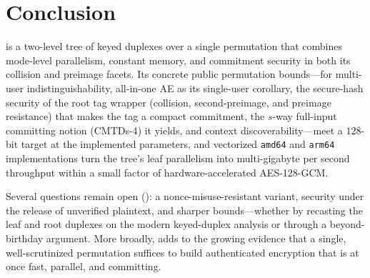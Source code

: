 \section{Conclusion}
\label{sec:conclusion}

\TW{} is a two-level tree of keyed duplexes over a single
\Keccakp{} permutation that combines mode-level parallelism,
constant memory, and commitment security in both its collision and
preimage facets. Its concrete public permutation bounds---for multi-user
indistinguishability, all-in-one AE as its single-user corollary, the
secure-hash security of the root tag wrapper (collision, second-preimage,
and preimage resistance) that makes the tag a compact commitment, the
$s$-way full-input committing notion (\textsf{CMTDs-4}) it yields, and
\cite{MLGR23} context discoverability---meet a
$128$-bit target at the implemented parameters,
and vectorized
\texttt{amd64} and \texttt{arm64} implementations turn the tree's leaf
parallelism into multi-gigabyte per second throughput within a small
factor of hardware-accelerated AES-128-GCM.

Several questions remain open (): a nonce-misuse-resistant
variant, security under the release of unverified plaintext, and sharper
bounds---whether by
recasting the leaf and root duplexes on the modern keyed-duplex analysis or
through a beyond-birthday argument. More broadly, \TW{} adds to the growing
evidence that a single, well-scrutinized \Keccak{} permutation suffices to build
authenticated encryption that is at once fast, parallel, and committing.
